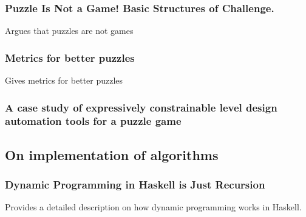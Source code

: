 \documentclass[a4paper]{article}
\begin{document}
\subsubsection{Puzzle Is Not a Game! Basic Structures of Challenge. \cite{karhulahti2013puzzle}}
Argues that puzzles are not games

\subsubsection{Metrics for better puzzles \cite{browne2013metrics}}
Gives metrics for better puzzles

\subsubsection{A case study of expressively constrainable level design automation tools for a puzzle game \cite{smith2012case}}

\subsection{On implementation of algorithms}

\subsubsection{Dynamic Programming in Haskell is Just Recursion \cite{justrecursion}}
Provides a detailed description on how dynamic programming works in Haskell.

{}

\end{document}
